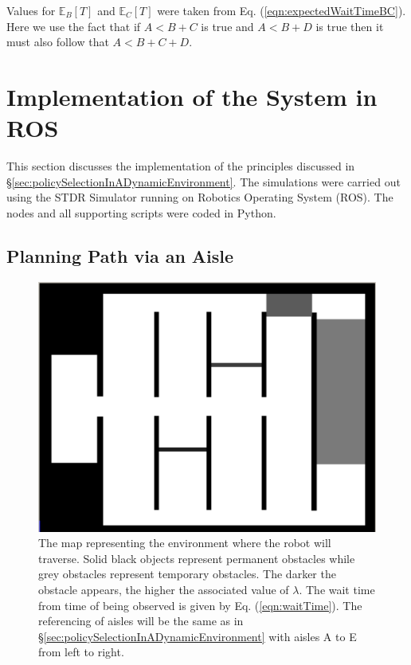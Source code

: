 \documentclass[a4paper,12pt]{article}
\begin{document}
			Values for $\mathbb{E}_{B}\left[T\right]$ and $\mathbb{E}_{C}\left[T\right]$ were taken from Eq. (\ref{eqn:expectedWaitTimeBC}). Here we use the fact that if $A<B+C$ is true and $A<B+D$ is true then it must also follow that $A<B+C+D$. 
	
	
	\section{Implementation of the System in ROS}
	\label{sec:implementationInROS}
		This section discusses the implementation of the principles discussed in \S \ref{sec:policySelectionInADynamicEnvironment}. The simulations were carried out using the STDR Simulator running on Robotics Operating System (ROS). The nodes and all supporting scripts were coded in Python. 
	
		\subsection{Planning Path via an Aisle}
		\label{sec:planningPathViaAisleROS}
		
		\begin{figure}[H]
			\centering
			\includegraphics[width=.5\textwidth]{images/stdr_map.png}
			\caption{The map representing the environment where the robot will traverse. Solid black objects represent permanent obstacles while grey obstacles represent temporary obstacles. The darker the obstacle appears, the higher the associated value of $\lambda$. The wait time from time of being observed is given by Eq. (\ref{eqn:waitTime}). The referencing of aisles will be the same as in \S \ref{sec:policySelectionInADynamicEnvironment} with aisles A to E from left to right.}
			\label{fig:stdrMap}
		\end{figure}
		
\end{document}
